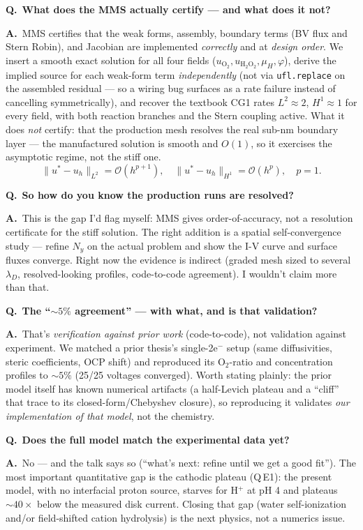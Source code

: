\documentclass[11pt]{article}
\newcommand{\Q}[1]{\medskip\par\noindent\textcolor{qcol}{\textbf{Q.}}\ \textbf{#1}\par\nopagebreak\smallskip}
\newcommand{\A}{\noindent\textbf{A.}\ \ignorespaces}
\begin{document}
\Q{What does the MMS actually certify --- and what does it not?}
\A MMS certifies that the weak forms, assembly, boundary terms (BV flux and
Stern Robin), and Jacobian are implemented \emph{correctly} and at
\emph{design order}. We insert a smooth exact solution for all four fields
($u_{\mathrm{O_2}},u_{\mathrm{H_2O_2}},\mu_H,\varphi$), derive the implied
source for each weak-form term \emph{independently} (not via
\texttt{ufl.replace} on the assembled residual --- so a wiring bug surfaces
as a rate failure instead of cancelling symmetrically), and recover the
textbook CG1 rates $L^2\approx2$, $H^1\approx1$ for every field, with both
reaction branches and the Stern coupling active. What it does \emph{not}
certify: that the production mesh resolves the real sub-nm boundary layer ---
the manufactured solution is smooth and $O(1)$, so it exercises the
asymptotic regime, not the stiff one.
\[
  \|u^\ast-u_h\|_{L^2}=\mathcal O(h^{p+1}),\quad
  \|u^\ast-u_h\|_{H^1}=\mathcal O(h^{p}),\quad p=1 .
\]

\Q{So how do you know the production runs are resolved?}
\A This is the gap I'd flag myself: MMS gives order-of-accuracy, not a
resolution certificate for the stiff solution. The right addition is a
spatial self-convergence study --- refine $N_y$ on the actual problem and show
the I-V curve and surface fluxes converge. Right now the evidence is
indirect (graded mesh sized to several $\lambda_D$, resolved-looking
profiles, code-to-code agreement). I wouldn't claim more than that.

\Q{The ``$\sim5\%$ agreement'' --- with what, and is that validation?}
\A That's \emph{verification against prior work} (code-to-code), not
validation against experiment. We matched a prior thesis's single-2e$^-$
setup (same diffusivities, steric coefficients, OCP shift) and reproduced
its O$_2$-ratio and concentration profiles to $\sim5\%$ (25/25 voltages
converged). Worth stating plainly: the prior model itself has known
numerical artifacts (a half-Levich plateau and a ``cliff'' that trace to its
closed-form/Chebyshev closure), so reproducing it validates \emph{our
implementation of that model}, not the chemistry.

\Q{Does the full model match the experimental data yet?}
\A No --- and the talk says so (``what's next: refine until we get a good
fit''). The most important quantitative gap is the cathodic plateau (Q\,E1):
the present model, with no interfacial proton source, starves for H$^+$ at
pH 4 and plateaus $\sim40\times$ below the measured disk current. Closing
that gap (water self-ionization and/or field-shifted cation hydrolysis) is
the next physics, not a numerics issue.
\end{document}
